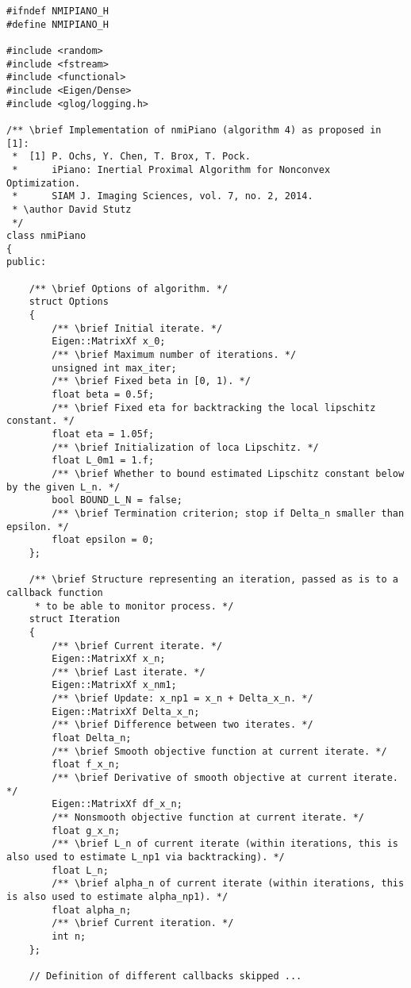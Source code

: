 \documentclass[11pt]{article}
\begin{document}
	\begin{lstlisting}
#ifndef NMIPIANO_H
#define	NMIPIANO_H

#include <random>
#include <fstream>
#include <functional>
#include <Eigen/Dense>
#include <glog/logging.h>

/** \brief Implementation of nmiPiano (algorithm 4) as proposed in [1]:
 *  [1] P. Ochs, Y. Chen, T. Brox, T. Pock.
 *      iPiano: Inertial Proximal Algorithm for Nonconvex Optimization.
 *      SIAM J. Imaging Sciences, vol. 7, no. 2, 2014.
 * \author David Stutz
 */
class nmiPiano
{
public:
    
    /** \brief Options of algorithm. */
    struct Options
    {
        /** \brief Initial iterate. */
        Eigen::MatrixXf x_0;
        /** \brief Maximum number of iterations. */
        unsigned int max_iter;
        /** \brief Fixed beta in [0, 1). */
        float beta = 0.5f;
        /** \brief Fixed eta for backtracking the local lipschitz constant. */
        float eta = 1.05f;
        /** \brief Initialization of loca Lipschitz. */
        float L_0m1 = 1.f;
        /** \brief Whether to bound estimated Lipschitz constant below by the given L_n. */
        bool BOUND_L_N = false;
        /** \brief Termination criterion; stop if Delta_n smaller than epsilon. */
        float epsilon = 0;
    };
    
    /** \brief Structure representing an iteration, passed as is to a callback function
     * to be able to monitor process. */
    struct Iteration
    {
        /** \brief Current iterate. */
        Eigen::MatrixXf x_n;
        /** \brief Last iterate. */
        Eigen::MatrixXf x_nm1;
        /** \brief Update: x_np1 = x_n + Delta_x_n. */
        Eigen::MatrixXf Delta_x_n;
        /** \brief Difference between two iterates. */
        float Delta_n;
        /** \brief Smooth objective function at current iterate. */
        float f_x_n;
        /** \brief Derivative of smooth objective at current iterate. */
        Eigen::MatrixXf df_x_n;
        /** Nonsmooth objective function at current iterate. */
        float g_x_n;
        /** \brief L_n of current iterate (within iterations, this is also used to estimate L_np1 via backtracking). */
        float L_n;
        /** \brief alpha_n of current iterate (within iterations, this is also used to estimate alpha_np1). */
        float alpha_n;
        /** \brief Current iteration. */
        int n;
    };
    
    // Definition of different callbacks skipped ...
    

\end{lstlisting}
\end{document}
